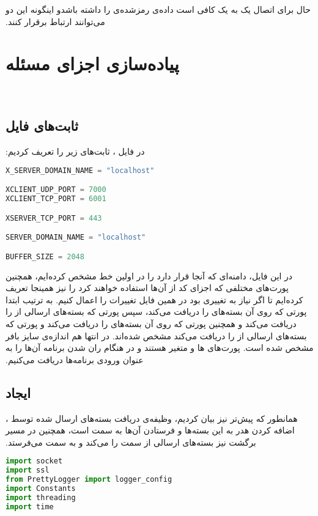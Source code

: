 ‫حال برای اتصال یک  به یک  کافی است  داده‌ی رمز‌شده‌ی  را داشته باشدو اینگونه این دو می‌توانند ارتباط  برقرار کنند.
‫
‫\section{پیاده‌سازی اجزای مسئله}
‫
‫\subsection{ثابت‌های فایل }
‫در فایل ، ثابت‌های زیر را تعریف کردیم:
‫
\begin{latin}
\begin{lstlisting}[firstnumber=1, language=Python]
X_SERVER_DOMAIN_NAME = "localhost"

XCLIENT_UDP_PORT = 7000
XCLIENT_TCP_PORT = 6001

XSERVER_TCP_PORT = 443

SERVER_DOMAIN_NAME = "localhost"

BUFFER_SIZE = 2048	
\end{lstlisting}
\end{latin}
‫
‫در این فایل، دامنه‌ای که 
‫آنجا قرار دارد را در اولین خط  مشخص کرده‌ایم، همچنین پورت‌های مختلفی که اجزای کد از آن‌ها استفاده خواهند کرد را نیز همینجا تعریف کرده‌ایم تا اگر نیاز به تغییری بود در همین فایل تغییرات را اعمال کنیم. به ترتیب ابتدا پورتی که 
‫روی آن بسته‌های 
‫را دریافت می‌کند، سپس پورتی که 
‫بسته‌های ارسالی از 
‫را دریافت می‌کند و همچنین پورتی که 
‫روی آن بسته‌های 
‫را دریافت می‌کند و پورتی که 
‫بسته‌های ارسالی از 
‫را دریافت می‌کند مشخص شده‌اند. در انتها هم اندازه‌ی سایز بافر مشخص شده است. 
‫پورت‌های ها و  متغیر هستند و در هنگام ران شدن برنامه آن‌ها را به عنوان ورودی برنامه‌ها دریافت می‌کنیم.
‫
‫‫\subsection{ایجاد }
‫همانطور که پیش‌تر نیز بیان کردیم، وظیفه‌ی  دریافت بسته‌های ارسال شده توسط ، اضافه کردن هدر  به این بسته‌ها و فرستادن آن‌ها به سمت  است، همچنین در مسیر برگشت نیز بسته‌های ارسالی از سمت  را  می‌کند و به سمت  می‌فرستد.
‫
\begin{latin}
\begin{lstlisting}[firstnumber=1, language=Python]
import socket
import ssl
from PrettyLogger import logger_config
import Constants
import threading
import time	
\end{lstlisting}
\end{latin}

